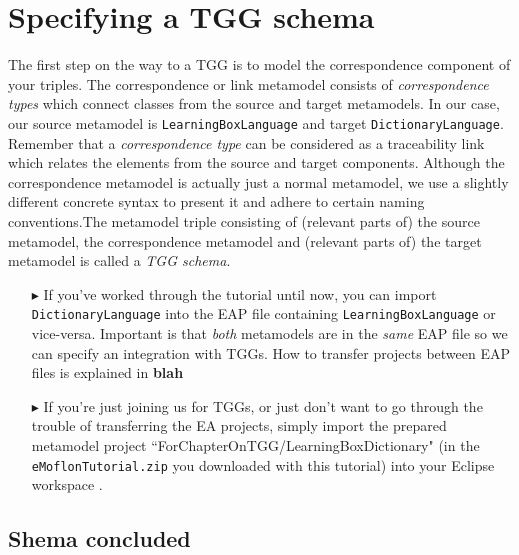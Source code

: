 \newpage
\section{Specifying a TGG schema}
\genHeader

The first step on the way to a TGG is to model the correspondence component of your triples. The correspondence or link metamodel consists of
\emph{correspondence types} which connect classes from the source and target metamodels. In our case, our source metamodel is \texttt{LearningBoxLanguage} and
target \texttt{DictionaryLanguage}. Remember that a \emph{correspondence type} can be considered as a traceability link which relates the elements from the
source and target components. Although the correspondence metamodel is actually just a normal metamodel, we use a slightly different concrete syntax to present
it and adhere to certain naming conventions.The metamodel triple consisting of (relevant parts of) the source metamodel, the correspondence
metamodel and (relevant parts of) the target metamodel is called a \emph{TGG schema}.

\begin{enumerate}
  
\item[$\blacktriangleright$] If you've worked through the tutorial until now, you can import \texttt{Dic\-tion\-ary\-Language} into the EAP file containing
\texttt{Learning\-Box\-Language} or vice-versa. Important is that \emph{both} metamodels are in the \emph{same} EAP file so we can specify an integration with
TGGs. How to transfer projects between EAP files is explained in {\bf blah}

\item[$\blacktriangleright$] If you're just joining us for TGGs, or just don't want to go through the trouble of transferring the EA projects, simply import the
prepared metamodel project ``For\-Chapter\-On\-TGG/Learning\-Box\-Dic\-tion\-ary" (in the \texttt{eMoflon\-Tutorial.zip} you downloaded with this tutorial)
into your Eclipse workspace .

\end{enumerate}





\newpage

\subsection{Shema concluded}
\genHeader

